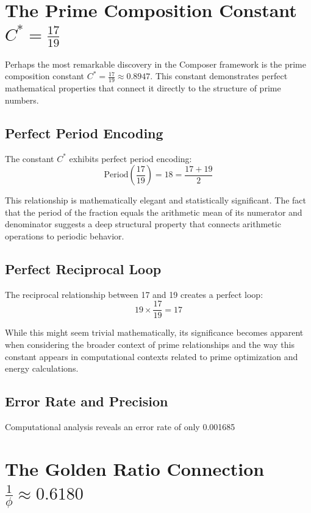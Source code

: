 \documentclass[12pt,a4paper]{report}
\newcommand{\Cstar}{C^*}
\begin{document}
\section{The Prime Composition Constant $\Cstar = \frac{17}{19}$}

Perhaps the most remarkable discovery in the Composer framework is the prime composition constant $\Cstar = \frac{17}{19} \approx 0.8947$. This constant demonstrates perfect mathematical properties that connect it directly to the structure of prime numbers.

\subsection{Perfect Period Encoding}

The constant $\Cstar$ exhibits perfect period encoding:
\[
\text{Period}\left(\frac{17}{19}\right) = 18 = \frac{17 + 19}{2}
\]

This relationship is mathematically elegant and statistically significant. The fact that the period of the fraction equals the arithmetic mean of its numerator and denominator suggests a deep structural property that connects arithmetic operations to periodic behavior.

\subsection{Perfect Reciprocal Loop}

The reciprocal relationship between 17 and 19 creates a perfect loop:
\[
19 \times \frac{17}{19} = 17
\]

While this might seem trivial mathematically, its significance becomes apparent when considering the broader context of prime relationships and the way this constant appears in computational contexts related to prime optimization and energy calculations.

\subsection{Error Rate and Precision}

Computational analysis reveals an error rate of only 0.001685%

\section{The Golden Ratio Connection $\frac{1}{\phi} \approx 0.6180$}
\end{document}
